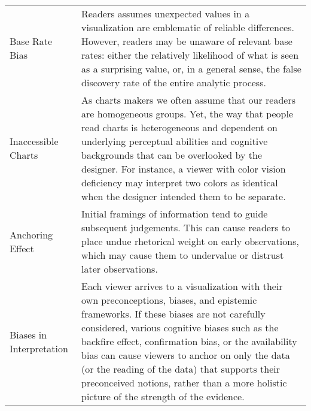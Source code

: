 \begin{table*}[ht!]
\begin{tabular}{p{2.2cm}p{14.8cm}}
   \rowcolor{colord}\multirow{4}{0em}{\hspace{-0.6cm}\rotatebox{90}{\normalsize{Reading}}}Base Rate Bias & Readers assumes unexpected values in a visualization are emblematic of reliable differences. However, readers may be unaware of relevant base rates: either the relatively likelihood of what is seen as a surprising value, or, in a general sense, the false discovery rate of the entire analytic process.  \cite{correll2016surprise,pu2018garden, zgraggen2018investigating}\\
 \rowcolor{colord-opaque}Inaccessible Charts & As charts makers we often assume that our readers are homogeneous groups. Yet, the way that people read charts is heterogeneous and dependent on underlying perceptual abilities and cognitive backgrounds that can be overlooked by the designer. For instance, a viewer with color vision deficiency may interpret two colors as identical when the designer intended them to be separate. \cite{lundgard2019Sociotechnical, plaisant2005information}\\
 \rowcolor{colord}Anchoring Effect  & Initial framings of information tend to guide subsequent judgements. This can cause readers to place undue rhetorical weight on early observations, which may cause them to undervalue or distrust later observations.  \cite{ritchie2019lie, hullman2011visualization}\\
 \rowcolor{colord-opaque}Biases in \newline Interpretation & Each viewer arrives to a visualization with their own preconceptions, biases, and epistemic frameworks. If these biases are not carefully considered, various cognitive biases such as the backfire effect, confirmation bias, or the availability bias can cause viewers to anchor on only the data (or the reading of the data) that supports their preconceived notions, rather than a more holistic picture of the strength of the evidence. \cite{dignazio2019draft, d2016feminist,valdez2017framework, few2019loom,wall2017warning}\\
\end{tabular}
\label{table:mirage-table}
\end{table*}
